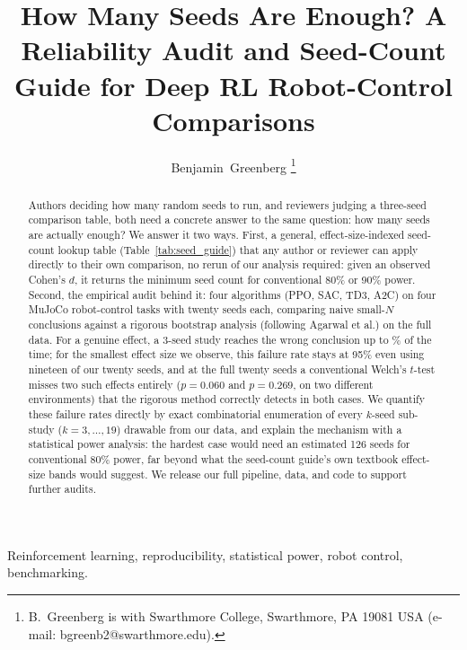 \documentclass[journal]{IEEEtran}
\begin{document}
\title{How Many Seeds Are Enough? A Reliability Audit and Seed-Count Guide for Deep RL Robot-Control Comparisons}

\author{Benjamin~Greenberg%
\thanks{B.~Greenberg is with Swarthmore College, Swarthmore, PA 19081 USA (e-mail: bgreenb2@swarthmore.edu).}}


\maketitle

\begin{abstract}
Authors deciding how many random seeds to run, and reviewers judging a three-seed comparison
table, both need a concrete answer to the same question: how many seeds are actually enough? We
answer it two ways. First, a general, effect-size-indexed seed-count lookup table
(Table~\ref{tab:seed_guide}) that any author or reviewer can apply directly to their own
comparison, no rerun of our analysis required: given an observed Cohen's $d$, it returns the
minimum seed count for conventional 80\% or 90\% power. Second, the empirical audit behind it:
four algorithms (PPO, SAC, TD3, A2C) on four MuJoCo robot-control tasks with twenty seeds each,
comparing naive small-$N$ conclusions against a rigorous bootstrap analysis (following Agarwal et
al.) on the full data. For a genuine effect, a 3-seed study reaches the wrong conclusion up to
\% of the time; for the smallest effect size we observe,
this failure rate stays at 95\% even using nineteen of our twenty seeds, and at the full twenty
seeds a conventional Welch's $t$-test misses two such effects entirely ($p=0.060$ and $p=0.269$,
on two different environments) that the rigorous method correctly detects in both cases. We
quantify these failure rates directly by exact combinatorial enumeration of every $k$-seed
sub-study ($k=3,\ldots,19$) drawable from our data, and explain the mechanism with a statistical
power analysis: the hardest case would need an estimated 126 seeds for conventional 80\% power,
far beyond what the seed-count guide's own textbook effect-size bands would suggest. We release
our full pipeline, data, and code to support further audits.
\end{abstract}

\begin{IEEEkeywords}
Reinforcement learning, reproducibility, statistical power, robot control, benchmarking.
\end{IEEEkeywords}
\end{document}
